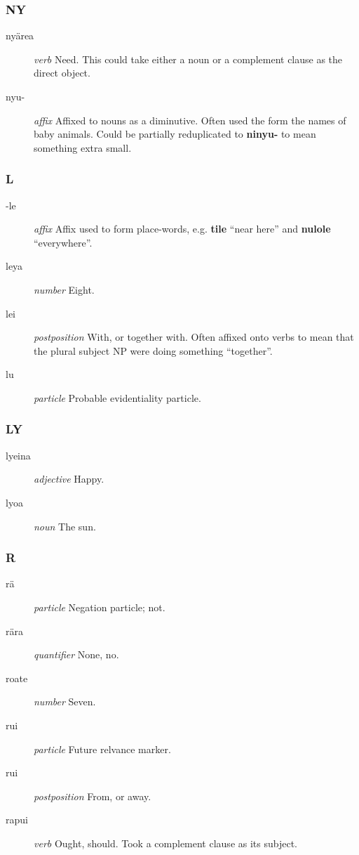 \documentclass{article}
\begin{document}
\subsubsection{NY}

\begin{description}
\item [ny\"area] \emph{verb} Need.  This could take either a noun or a complement clause as the direct object.
\item [nyu-] \emph{affix} Affixed to nouns as a diminutive.  Often used the form the names of baby animals.  Could be partially reduplicated to \textbf{ninyu-} to mean something extra small.
\end{description}

\subsubsection{L}

\begin{description}
\item [-le] \emph{affix} Affix used to form place-words, e.g. \textbf{tile} ``near here'' and \textbf{nulole} ``everywhere''.
\item [leya] \emph{number} Eight.
\item [lei] \emph{postposition} With, or together with.  Often affixed onto verbs to mean that the plural subject NP were doing something ``together''.
\item [lu] \emph{particle} Probable evidentiality particle.
\end{description}

\subsubsection{LY}

\begin{description}
\item [lyeina] \emph{adjective} Happy.
\item [lyoa] \emph{noun} The sun.
\end{description}

\subsubsection{R}

\begin{description}
\item [r\"a] \emph{particle} Negation particle; not.
\item [r\"ara] \emph{quantifier} None, no.
\item [roate] \emph{number} Seven.
\item [rui] \emph{particle} Future relvance marker.
\item [rui] \emph{postposition} From, or away.
\item [rapui] \emph{verb} Ought, should. Took a complement clause as its subject.
\end{description}
\end{document}
